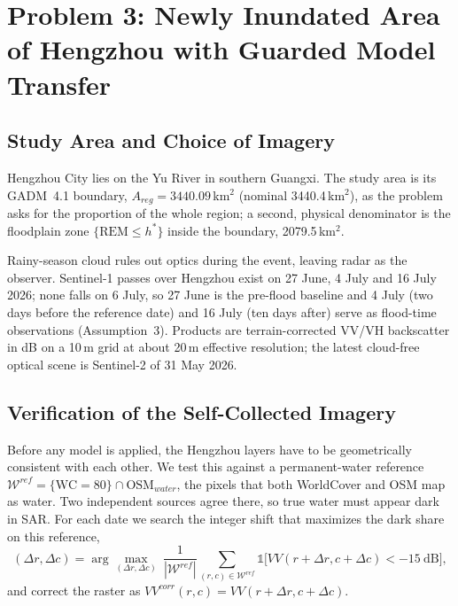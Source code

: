 \section[Problem 3]{Problem 3: Newly Inundated Area of Hengzhou with Guarded Model Transfer}
\label{sec:q3}

\subsection{Study Area and Choice of Imagery}

Hengzhou City lies on the Yu River in southern Guangxi. The study area is its GADM~4.1 boundary, $A_{reg}=3440.09$\,km$^2$ (nominal 3440.4\,km$^2$), as the problem asks for the proportion of the whole region; a second, physical denominator is the floodplain zone $\{\mathrm{REM}\le h^*\}$ inside the boundary, 2079.5\,km$^2$.

Rainy-season cloud rules out optics during the event, leaving radar as the observer. Sentinel-1 passes over Hengzhou exist on 27 June, 4 July and 16 July 2026; none falls on 6 July, so 27 June is the pre-flood baseline and 4 July (two days before the reference date) and 16 July (ten days after) serve as flood-time observations (Assumption~3). Products are terrain-corrected VV/VH backscatter in dB on a 10\,m grid at about 20\,m effective resolution; the latest cloud-free optical scene is Sentinel-2 of 31 May 2026.

\subsection{Verification of the Self-Collected Imagery}
\label{sec:q3_verify}

Before any model is applied, the Hengzhou layers have to be geometrically consistent with each other. We test this against a permanent-water reference $\mathcal W^{ref}=\{\mathrm{WC}=80\}\cap\mathrm{OSM}_{water}$, the pixels that both WorldCover and OSM map as water. Two independent sources agree there, so true water must appear dark in SAR. For each date we search the integer shift that maximizes the dark share on this reference,
\begin{equation}
(\Delta r,\Delta c)=\arg\max_{(\Delta r,\Delta c)}\ \frac{1}{|\mathcal W^{ref}|}\sum_{(r,c)\in\mathcal W^{ref}}\mathbb 1\big[VV(r+\Delta r,c+\Delta c)<-15\ \mathrm{dB}\big],
\label{eq:coreg}
\end{equation}
and correct the raster as $VV^{corr}(r,c)=VV(r+\Delta r,c+\Delta c)$.

